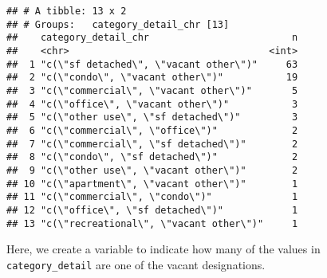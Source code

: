 \documentclass[]{article}
\newenvironment{Shaded}{\begin{snugshade}}{\end{snugshade}}
\newcommand{\KeywordTok}[1]{\textcolor[rgb]{0.13,0.29,0.53}{\textbf{#1}}}
\newcommand{\DataTypeTok}[1]{\textcolor[rgb]{0.13,0.29,0.53}{#1}}
\newcommand{\StringTok}[1]{\textcolor[rgb]{0.31,0.60,0.02}{#1}}
\newcommand{\OperatorTok}[1]{\textcolor[rgb]{0.81,0.36,0.00}{\textbf{#1}}}
\newcommand{\NormalTok}[1]{#1}
\begin{document}
\begin{verbatim}
## # A tibble: 13 x 2
## # Groups:   category_detail_chr [13]
##    category_detail_chr                         n
##    <chr>                                   <int>
##  1 "c(\"sf detached\", \"vacant other\")"     63
##  2 "c(\"condo\", \"vacant other\")"           19
##  3 "c(\"commercial\", \"vacant other\")"       5
##  4 "c(\"office\", \"vacant other\")"           3
##  5 "c(\"other use\", \"sf detached\")"         3
##  6 "c(\"commercial\", \"office\")"             2
##  7 "c(\"commercial\", \"sf detached\")"        2
##  8 "c(\"condo\", \"sf detached\")"             2
##  9 "c(\"other use\", \"vacant other\")"        2
## 10 "c(\"apartment\", \"vacant other\")"        1
## 11 "c(\"commercial\", \"condo\")"              1
## 12 "c(\"office\", \"sf detached\")"            1
## 13 "c(\"recreational\", \"vacant other\")"     1
\end{verbatim}

Here, we create a variable to indicate how many of the values in
\texttt{category\_detail} are one of the vacant designations.

\begin{Shaded}
\end{Shaded}
\end{document}
